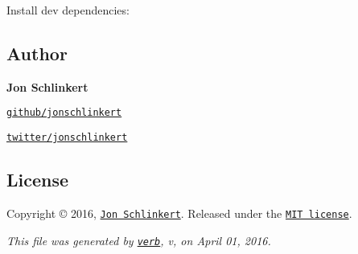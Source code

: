Install dev dependencies\+:




\subsection*{Author}

{\bfseries Jon Schlinkert}


\begin{DoxyItemize}
\item \href{https://github.com/jonschlinkert}{\tt github/jonschlinkert}
\item \href{http://twitter.com/jonschlinkert}{\tt twitter/jonschlinkert}
\end{DoxyItemize}

\subsection*{License}

Copyright © 2016, \href{https://github.com/jonschlinkert}{\tt Jon Schlinkert}. Released under the \href{https://github.com/jonschlinkert/regex-cache/blob/master/LICENSE}{\tt M\+IT license}.





{\itshape This file was generated by \href{https://github.com/verbose/verb}{\tt verb}, v, on April 01, 2016.} 